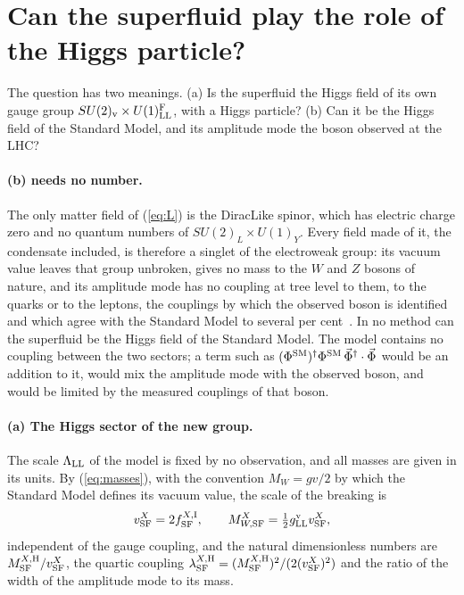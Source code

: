 \documentclass[aps,prd,twocolumn,superscriptaddress,nofootinbib,floatfix,longbibliography]{revtex4-2}
\newcommand{\LL}{{\rm LL}}
\newcommand{\SF}{{\rm SF}}
\begin{document}
\section{Can the superfluid play the role of the Higgs particle?}
\label{sec:higgs}

The question has two meanings. (a) Is the superfluid the Higgs field of its own gauge group
$SU(2)_{\rm v}\times U(1)^{\rm F}_\LL$, with a Higgs particle? (b) Can it be the Higgs field of the Standard Model, and its
amplitude mode the boson observed at the LHC?

\paragraph*{(b) needs no number.}
The only matter field of (\ref{eq:L}) is the DiracLike spinor, which has electric charge zero and no quantum numbers of
$SU(2)_L\times U(1)_Y$. Every field made of it, the condensate included, is therefore a singlet of the electroweak group:
its vacuum value leaves that group unbroken, gives no mass to the $W$ and $Z$ bosons of nature, and its amplitude mode
has no coupling at tree level to them, to the quarks or to the leptons, the couplings by which the observed boson is
identified and which agree with the Standard Model to several per cent~\cite{ATLAS2022,CMS2022}. In no method can the
superfluid be the Higgs field of the Standard Model. The model contains no coupling between the two sectors; a term such
as $(\Phi^{\rm SM})^\dagger\Phi^{\rm SM}\,\vec\Phi^\dagger\cdot\vec\Phi$ would be an addition to it, would mix the amplitude mode
with the observed boson, and would be limited by the measured couplings of that boson.

\paragraph*{(a) The Higgs sector of the new group.}
The scale $\Lambda_\LL$ of the model is fixed by no observation, and all masses are given in its units. By
(\ref{eq:masses}), with the convention $M_W=gv/2$ by which the Standard Model defines its vacuum value, the scale of the
breaking is
\begin{equation}
v^X_\SF=2f^{X,{\rm I}}_\SF ,\qquad M^X_{W,\SF}=\tfrac12g^{\rm v}_\LL v^X_\SF ,
\label{eq:vSF}
\end{equation}
independent of the gauge coupling, and the natural dimensionless numbers are $M^{X,{\rm H}}_\SF/v^X_\SF$, the quartic coupling
$\lambda^{X,{\rm H}}_\SF=(M^{X,{\rm H}}_\SF)^2/(2(v^X_\SF)^2)$ and the ratio of the width of the amplitude mode to its mass.
\end{document}
